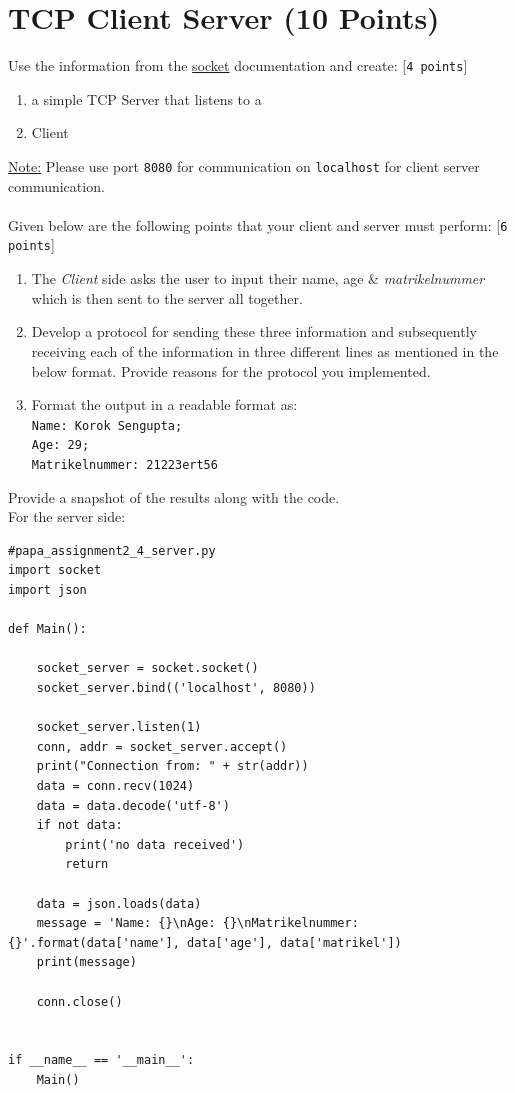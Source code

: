 \documentclass{WeSTassignment}
\begin{document}

\section{TCP Client Server (10 Points)}

Use the information from the \href{https://docs.python.org/3/howto/sockets.html}{socket} documentation and create: [\texttt{4 points}]
\begin{enumerate}
\item a simple TCP Server that listens to a
\item Client
\end{enumerate}
\underline{Note:} Please use port \texttt{8080} for communication on \texttt{localhost} for client server communication.\\ \\
Given below are the following points that your client and server must perform: [\texttt{6 points}]
\begin{enumerate}
\item The \emph{Client} side asks the user to input their name, age \& \emph{matrikelnummer} which is then sent to the server all together.
\item Develop a protocol for sending these three information and subsequently receiving each of the information in three different lines as mentioned in the below format. Provide reasons for the protocol you implemented. 
\item Format the output in a readable format as:\texttt{\\ Name: Korok Sengupta; \\ Age: 29; \\ Matrikelnummer: 21223ert56}
\end{enumerate}

Provide a snapshot of the results along with the code. \\


For the server side:
\begin{lstlisting}
#papa_assignment2_4_server.py
import socket
import json

def Main():

    socket_server = socket.socket()
    socket_server.bind(('localhost', 8080))

    socket_server.listen(1)
    conn, addr = socket_server.accept()
    print("Connection from: " + str(addr))
    data = conn.recv(1024)
    data = data.decode('utf-8')
    if not data:
        print('no data received')
        return

    data = json.loads(data)
    message = 'Name: {}\nAge: {}\nMatrikelnummer: {}'.format(data['name'], data['age'], data['matrikel'])
    print(message)

    conn.close()


if __name__ == '__main__':
    Main()
\end{lstlisting}
\end{document}
